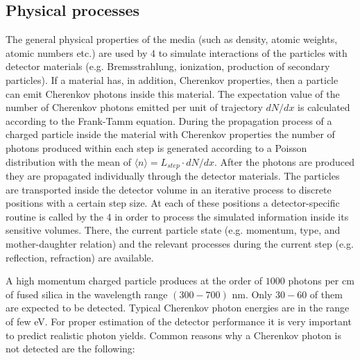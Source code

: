 \subsection{Physical processes}

The general physical properties of the media (such as density, atomic weights, atomic numbers etc.) are used by {\geant}4 to simulate interactions of the particles with detector materials (e.g. Bremsstrahlung, ionization, production of secondary particles). If a material has, in addition, Cherenkov properties, then a particle can emit Cherenkov photons inside this material. The expectation value of the number of Cherenkov photons emitted per unit of trajectory $dN/dx$ is calculated according to the Frank-Tamm equation. During the propagation process of a charged particle inside the material with Cherenkov properties the number of photons produced within each step is generated according to a Poisson distribution with the mean of $\langle n \rangle = L_{step} \cdot dN/dx$. After the photons are produced they are propagated individually through the detector materials. The particles are transported inside the detector volume in an iterative process to discrete positions with a certain step size. At each of these positions a detector-specific routine is called by the {\geant}4 in order to process the simulated information inside its sensitive volumes. There, the current particle state (e.g. momentum, type, and mother-daughter relation) and the relevant processes during the current step (e.g. reflection, refraction) are available.

A high momentum charged particle produces at the order of $1000$ photons per cm of fused silica in the wavelength range $(300-700)$ nm. Only $30-60$ of them are expected to be detected. Typical Cherenkov photon energies are in the range of few eV. For proper estimation of the detector performance it is very important to predict realistic photon yields. Common reasons why a Cherenkov photon is not detected are the following:

